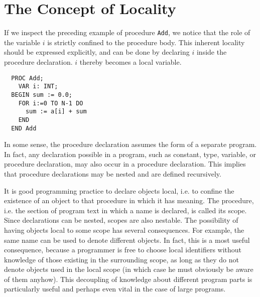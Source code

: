 \chapter{The Concept of Locality}
If we inspect the preceding example of procedure \verb|Add|, we notice that the role of the
variable $i$ is strictly confined to the procedure body. This inherent locality should be expressed
explicitly, and can be done by declaring $i$ inside the procedure declaration. $i$ thereby becomes
a local variable.
\begin{verbatim}
  PROC Add;
    VAR i: INT;
  BEGIN sum := 0.0;
    FOR i:=0 TO N-1 DO
      sum := a[i] + sum
    END
  END Add
\end{verbatim}
In some sense, the procedure declaration assumes the form of a separate program. In fact, any
declaration possible in a program, such as constant, type, variable, or procedure declaration,
may also occur in a procedure declaration. This implies that procedure declarations may be
nested and are defined recursively.

It is good programming practice to declare objects local, i.e. to confine the existence of an object
to that procedure in which it has meaning. The procedure, i.e. the section of program text in which
a name is declared, is called its scope. Since declarations can be nested, scopes are also nestable.
The possibility of having objects local to some scope has several consequences. For example, the
same name can be used to denote different objects. In fact, this is a most useful consequence,
because a programmer is free to choose local identifiers without knowledge of those existing in the
surrounding scope, as long as they do not denote objects used in the local scope (in which case he
must obviously be aware of them anyhow). This decoupling of knowledge about different program
parts is particularly useful and perhaps even vital in the case of large programs.

